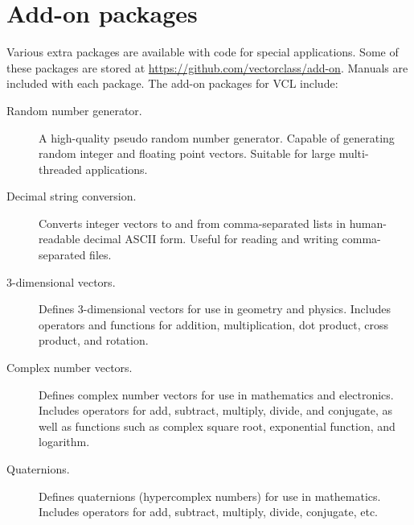 \documentclass[vcl_manual.tex]{subfiles}
\begin{document}
\chapter{Add-on packages}\label{chap:AddOnPackages}
\flushleft

Various extra packages are available with code for special applications. 
Some of these packages are stored at \url{https://github.com/vectorclass/add-on}.
Manuals are included with each package. The add-on packages for VCL include:

\begin{description}

\item[Random number generator.] 
   A high-quality pseudo random number generator. Capable of generating random integer and floating point vectors. Suitable for large multi-threaded applications.

\item[Decimal string conversion.] 
   Converts integer vectors to and from comma-separated lists in human-readable decimal ASCII form. Useful for reading and writing comma-separated files.

\item[3-dimensional vectors.] 
   Defines 3-dimensional vectors for use in geometry and physics. 
   Includes operators and functions for addition, multiplication, dot product, cross product, and rotation.
   
\item[Complex number vectors.]    
   Defines complex number vectors for use in mathematics and electronics. 
   Includes operators for add, subtract, multiply, divide, and conjugate, as well as functions such as complex square root, exponential function, and logarithm.
   
\item[Quaternions.]    
   Defines quaternions (hypercomplex numbers) for use in mathematics.
   Includes operators for add, subtract, multiply, divide, conjugate, etc.




\end{description}
\end{document}

